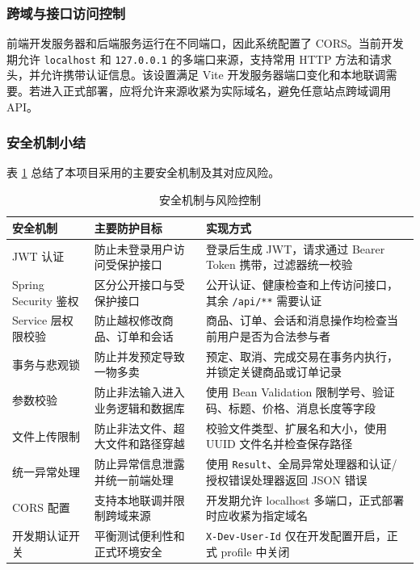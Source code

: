 ﻿\documentclass[UTF8,a4paper,12pt]{ctexart}
\begin{document}
\subsubsection{跨域与接口访问控制}
前端开发服务器和后端服务运行在不同端口，因此系统配置了 CORS。当前开发期允许 \texttt{localhost} 和 \texttt{127.0.0.1} 的多端口来源，支持常用 HTTP 方法和请求头，并允许携带认证信息。该设置满足 Vite 开发服务器端口变化和本地联调需要。若进入正式部署，应将允许来源收紧为实际域名，避免任意站点跨域调用 API。

\subsubsection{安全机制小结}
表 \ref{tab:security-mechanisms} 总结了本项目采用的主要安全机制及其对应风险。

\begin{table}[H]
  \centering
  \caption{安全机制与风险控制}
  \label{tab:security-mechanisms}
  \begin{tabular}{p{3.2cm}p{4.4cm}p{5.8cm}}
    \toprule
    安全机制 & 主要防护目标 & 实现方式 \\
    \midrule
    JWT 认证 & 防止未登录用户访问受保护接口 & 登录后生成 JWT，请求通过 Bearer Token 携带，过滤器统一校验 \\
    Spring Security 鉴权 & 区分公开接口与受保护接口 & 公开认证、健康检查和上传访问接口，其余 \texttt{/api/**} 需要认证 \\
    Service 层权限校验 & 防止越权修改商品、订单和会话 & 商品、订单、会话和消息操作均检查当前用户是否为合法参与者 \\
    事务与悲观锁 & 防止并发预定导致一物多卖 & 预定、取消、完成交易在事务内执行，并锁定关键商品或订单记录 \\
    参数校验 & 防止非法输入进入业务逻辑和数据库 & 使用 Bean Validation 限制学号、验证码、标题、价格、消息长度等字段 \\
    文件上传限制 & 防止非法文件、超大文件和路径穿越 & 校验文件类型、扩展名和大小，使用 UUID 文件名并检查保存路径 \\
    统一异常处理 & 防止异常信息泄露并统一前端处理 & 使用 \texttt{Result}、全局异常处理器和认证/授权错误处理器返回 JSON 错误 \\
    CORS 配置 & 支持本地联调并限制跨域来源 & 开发期允许 localhost 多端口，正式部署时应收紧为指定域名 \\
    开发期认证开关 & 平衡测试便利性和正式环境安全 & \texttt{X-Dev-User-Id} 仅在开发配置开启，正式 profile 中关闭 \\
    \bottomrule
  \end{tabular}
\end{table}
\end{document}

